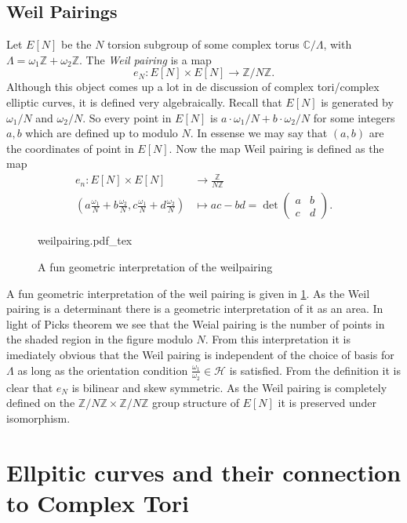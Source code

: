 \documentclass[a4paper]{article}
\newcommand{\incfig}[1]{%
	\def\svgwidth{\columnwidth}
	{#1.pdf_tex}
}
\theoremstyle{theoremdd}
\theoremstyle{definitiondd}
\theoremstyle{remarkdd}
\newcommand{\Z}{\mathbb{Z}}
\newcommand{\C}{\mathbb{C}}
\begin{document}
\subsection{Weil Pairings} \label{sec:Weil_Pairings}
Let $E[N]$ be the  $N$ torsion subgroup of some complex torus $\C / \Lambda$, with $\Lambda = \omega_1\Z + \omega_2 \Z$. 
The \emph{Weil pairing} is a map \[
	e_N: E[N] \times E[N] \to \Z / N\Z
.\] 
Although this object comes up a lot in de discussion of complex tori/complex elliptic curves, it is defined very algebraically. 
Recall that $E[N]$ is generated by $\omega_1 / N$ and $\omega_2 / N$. So every point in $E[N]$ is  $a \cdot \omega_1 / N + b \cdot \omega_2 / N$ for some integers $a, b$ which are defined up to modulo $N$. In essense we may say that $(a, b)$ are the coordinates of point in $E[N]$. 
Now the map Weil pairing is defined as the map
\begin{align*}
	e_n: E[N] \times  E[N] &\longrightarrow \frac{\Z}{N\Z} \\
	\left(a \frac{\omega_1}{N} + b \frac{\omega_2}{N}, c \frac{\omega_1}{N} + d \frac{\omega_2}{N}\right) &\longmapsto ac-bd =  \det \begin{pmatrix} a & b \\ c& d \end{pmatrix} 
.\end{align*}
\begin{figure}[h]
	\incfig{weilpairing}
	\caption{A fun geometric interpretation of the weilpairing}
	\label{fig:weilpairing}
\end{figure}
A fun geometric interpretation of the weil pairing is given in \cref{fig:weilpairing}. As the Weil pairing is a determinant there is a geometric interpretation of it as an area. In light of Picks theorem \cite{wiki:pick} we see that the Weial pairing is the number of points in the shaded region in the figure modulo $N$. 
From this interpretation it is imediately obvious that the Weil pairing is independent of the choice of basis for  $\Lambda$ as long as the orientation condition $\frac{\omega_1}{\omega_2} \in \mathcal{H}$ is satisfied. 
From the definition it is clear that $e_N$ is bilinear and skew symmetric.
As the Weil pairing is completely defined on the  $\Z / N \Z \times  \Z / N\Z$ group structure of $E[N]$ it is preserved under isomorphism.
\section{Ellpitic curves and their connection to Complex Tori}
\end{document}
